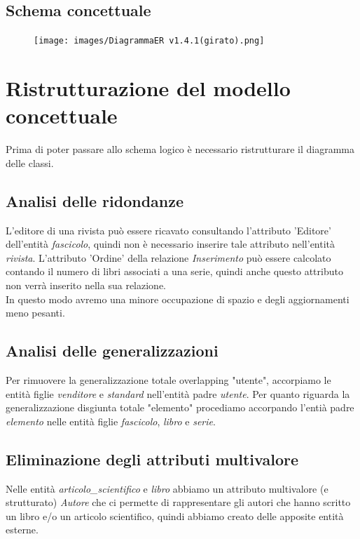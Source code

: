 \documentclass{article}
\begin{document}
\newpage
\subsection{Schema concettuale}
\begin{figure}[htp!]
    \texttt{[image: images/DiagrammaER v1.4.1(girato).png]}
\end{figure}

\newpage
\section{Ristrutturazione del modello concettuale}
Prima di poter passare allo schema logico è necessario ristrutturare il diagramma delle classi.

\subsection{Analisi delle ridondanze}
L'editore di una rivista può essere ricavato consultando l'attributo 'Editore' dell'entità \textit{fascicolo}, quindi non è necessario inserire tale attributo nell'entità \textit{rivista}. L'attributo 'Ordine' della relazione \textit{Inserimento} può essere calcolato contando il numero di libri associati a una serie, quindi anche questo attributo non verrà inserito nella sua relazione.\\ In questo modo avremo una minore occupazione di spazio e degli aggiornamenti meno pesanti.

\subsection{Analisi delle generalizzazioni}
Per rimuovere la generalizzazione totale overlapping "utente", accorpiamo le entità figlie \textit{venditore} e \textit{standard} nell'entità padre \textit{utente}.
Per quanto riguarda la generalizzazione disgiunta totale "elemento" procediamo accorpando l'entià padre \textit{elemento} nelle entità figlie \textit{fascicolo}, \textit{libro} e \textit{serie}.

\subsection{Eliminazione degli attributi multivalore}
Nelle entità \textit{articolo\_scientifico} e \textit{libro} abbiamo un attributo multivalore (e strutturato) \textit{Autore} che ci permette di rappresentare gli autori che hanno scritto un libro e/o un articolo scientifico, quindi abbiamo creato delle apposite entità esterne.
\end{document}
